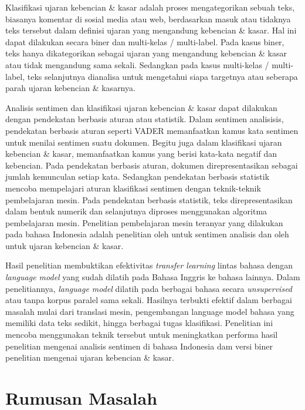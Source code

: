Klasifikasi ujaran kebencian \& kasar adalah proses mengategorikan sebuah teks, biasanya komentar di sosial media atau web, berdasarkan masuk atau tidaknya teks tersebut dalam definisi ujaran yang mengandung kebencian \& kasar. Hal ini dapat dilakukan secara biner dan multi-kelas / multi-label. Pada kasus biner, teks hanya dikategorikan sebagai ujaran yang mengandung kebencian \& kasar atau tidak mengandung sama sekali. Sedangkan pada kasus multi-kelas / multi-label, teks selanjutnya dianalisa untuk mengetahui siapa targetnya atau seberapa parah ujaran kebencian \& kasarnya.

Analisis sentimen dan klasifikasi ujaran kebencian \& kasar dapat dilakukan dengan pendekatan berbasis aturan atau statistik. Dalam sentimen analisisis, pendekatan berbasis aturan seperti VADER \parencite{VADER} memanfaatkan kamus kata sentimen untuk menilai sentimen suatu dokumen. Begitu juga dalam klasifikasi ujaran kebencian \& kasar, \parencite{lexicon_hatespeech_2015} memanfaatkan kamus yang berisi kata-kata negatif dan kebencian. Pada pendekatan berbasis aturan, dokumen direpresentasikan sebagai jumlah kemunculan setiap kata. Sedangkan pendekatan berbasis statistik mencoba mempelajari aturan klasifikasi sentimen dengan teknik-teknik pembelajaran mesin. Pada pendekatan berbasis statistik, teks direpresentasikan dalam bentuk numerik dan selanjutnya diproses menggunakan algoritma pembelajaran mesin. Penelitian pembelajaran mesin teranyar yang dilakukan pada bahasa Indonesia adalah penelitian oleh \parencite{CrisdayantiPurwarianti2019} untuk sentimen analisis dan oleh \parencite{Ibrohim_Budi_2019} untuk ujaran kebencian \& kasar.

Hasil penelitian \parencite{LampleConneau2019} membuktikan efektivitas \textit{transfer learning} lintas bahasa dengan \textit{language model} yang sudah dilatih pada Bahasa Inggris ke bahasa lainnya. Dalam penelitiannya, \textit{language model} dilatih pada berbagai bahasa secara \textit{unsupervised} atau tanpa korpus paralel sama sekali. Hasilnya terbukti efektif dalam berbagai masalah mulai dari translasi mesin, pengembangan language model bahasa yang memiliki data teks sedikit, hingga berbagai tugas klasifikasi. Penelitian ini mencoba menggunakan teknik tersebut untuk meningkatkan performa hasil penelitian \parencite{CrisdayantiPurwarianti2019} mengenai analisis sentimen di bahasa Indonesia dam versi biner penelitian \parencite{Ibrohim_Budi_2019} mengenai ujaran kebencian \& kasar. 

\section{Rumusan Masalah}

